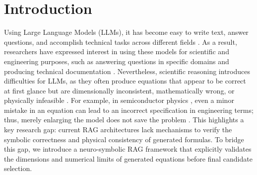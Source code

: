\documentclass[a4paper,fleqn]{cas-sc}
\begin{document}
\section{Introduction}
Using Large Language Models (LLMs), it has become easy to write text, answer questions, and accomplish technical tasks across different fields \citep{brown2020gpt3, touvron2023llama}. As a result, researchers have expressed interest in using these models for scientific and engineering purposes, such as answering questions in specific domains and producing technical documentation \citep{taylor2022galactica}. Nevertheless, scientific reasoning introduces difficulties for LLMs, as they often produce equations that appear to be correct at first glance but are dimensionally inconsistent, mathematically wrong, or physically infeasible \citep{SciBench,INDUS2024}. For example, in semiconductor physics \citep{Sze-Book}, even a minor mistake in an equation can lead to an incorrect specification in engineering terms; thus, merely enlarging the model does not save the problem \citep{ji2023survey, bang2023multitask}. This highlights a key research gap: current RAG architectures lack mechanisms to verify the symbolic correctness and physical consistency of generated formulas. To bridge this gap, we introduce a neuro-symbolic RAG framework that explicitly validates the dimensions and numerical limits of generated equations before final candidate selection.
\end{document}
